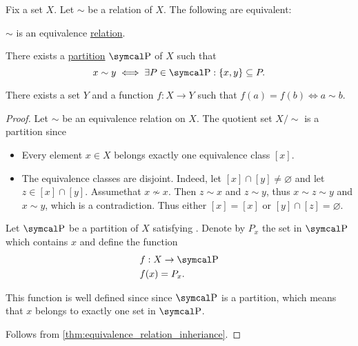 \begin{proposition}\label{thm:equivalence_partition}
  Fix a set \( X \). Let \( \sim \) be a relation of \( X \). The following are equivalent:
  \begin{defenum}
     \( \sim \) is an equivalence \hyperref[def:equivalence_relation]{relation}.

     There exists a \hyperref[def:set_partition]{partition} \( \CP \) of \( X \) such that
    \begin{equation}\label{thm:equivalence_partition/partition/property}
      x \sim y \iff \exists P \in \CP: \{ x, y \} \subseteq P.
    \end{equation}

     There exists a set \( Y \) and a function \( f: X \to Y \) such that \( f(a) = f(b) \iff a \sim b \).
  \end{defenum}
\end{proposition}
\begin{proof}
   Let \( \sim \) be an equivalence relation on \( X \). The quotient set \( X / \sim \) is a partition since
  \begin{itemize}
    \item Every element \( x \in X \) belongs exactly one equivalence class \( [x] \).
    \item The equivalence classes are disjoint. Indeed, let \( [x] \cap [y] \neq \varnothing \) and let \( z \in [x] \cap [y] \). Assume\LEM that \( x \not\sim x \). Then \( z \sim x \) and \( z \sim y \), thus \( x \sim z \sim y \) and \( x \sim y \), which is a contradiction. Thus either \( [x] = [x] \) or \( [y] \cap [z] = \varnothing \).
  \end{itemize}

   Let \( \CP \) be a partition of \( X \) satisfying . Denote by \( P_x \) the set in \( \CP \) which contains \( x \) and define the function
  \begin{align*}
    &f: X \to \CP \\
    &f(x) = P_x.
  \end{align*}

  This function is well defined since since \( \CP \) is a partition, which means that \( x \) belongs to exactly one set in \( \CP \).

   Follows from \cref{thm:equivalence_relation_inheriance}.
\end{proof}
